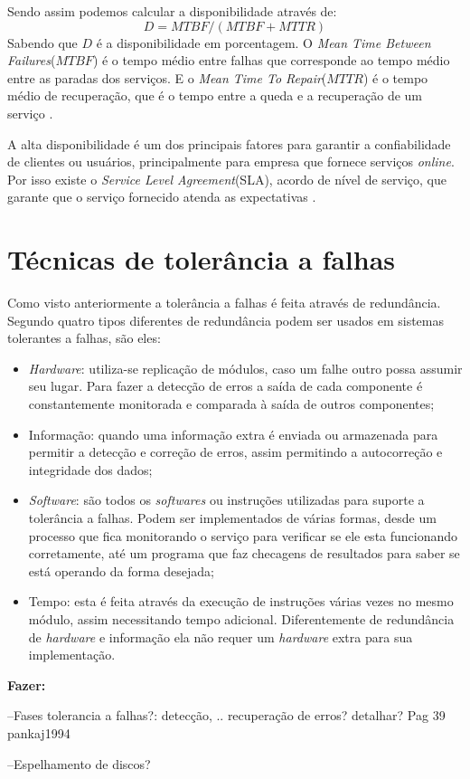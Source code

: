 Sendo assim podemos calcular a disponibilidade através de:\\
\begin{equation}
D = MTBF / (MTBF + MTTR)
\label{diponibilidade}
\end{equation}
Sabendo que $D$ é a disponibilidade em porcentagem. O \textit{Mean Time Between Failures}($MTBF$) é o tempo médio entre falhas que corresponde
ao tempo médio entre as paradas dos serviços. E o \textit{Mean Time To Repair}($MTTR$) é o tempo médio de recuperação, que é o tempo 
entre a queda e a recuperação de um serviço \cite{goncalves2009}.

A alta disponibilidade é um dos principais fatores para garantir a confiabilidade de clientes ou usuários, principalmente para empresa que 
fornece serviços \textit{online}. Por isso existe o \textit{Service Level Agreement}(SLA), acordo de nível de serviço, 
que garante que o serviço fornecido atenda as expectativas \cite{smith2010}.

\section{Técnicas de tolerância a falhas}

Como visto anteriormente a tolerância a falhas é feita através de redundância. Segundo \cite{norvag2000} quatro tipos diferentes de redundância
podem ser usados em sistemas tolerantes a falhas, são eles:
\begin{itemize}
 \item \textit{Hardware}: utiliza-se replicação de módulos, caso um falhe outro possa assumir seu lugar. Para fazer a detecção de erros
 a saída de cada componente é constantemente monitorada e comparada à saída de outros componentes;
 \item Informação: quando uma informação extra é enviada ou armazenada para permitir a detecção e correção de erros, assim permitindo
 a autocorreção e integridade dos dados;
 \item \textit{Software}: são todos os \textit{softwares} ou instruções utilizadas para suporte a tolerância a falhas. Podem ser implementados
 de várias formas, desde um processo que fica monitorando o serviço para verificar se ele esta funcionando corretamente, até um programa
 que faz checagens de resultados para saber se está operando da forma desejada;
 \item Tempo: esta é feita através da execução de instruções várias vezes no mesmo módulo, assim necessitando tempo adicional. 
 Diferentemente de redundância de \textit{hardware} e informação ela não requer um \textit{hardware} extra para sua implementação.
\end{itemize}



\textbf{Fazer:} 

--Fases tolerancia a falhas?: detecção, .. recuperação de erros? detalhar? Pag 39 pankaj1994

--Espelhamento de discos?


